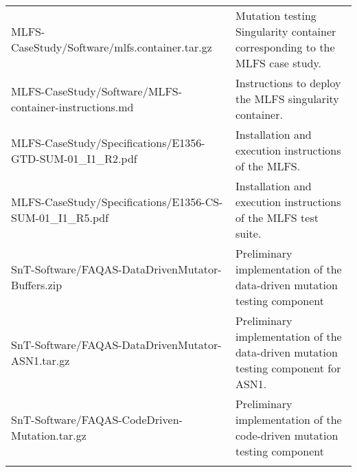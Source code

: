 \begin{longtable}{|p{8cm}|p{6cm}@{}|}
\hline
MLFS-CaseStudy/Software/mlfs.container.tar.gz&Mutation testing Singularity container corresponding to the MLFS case study.\\
MLFS-CaseStudy/Software/MLFS-container-instructions.md&Instructions to deploy the MLFS singularity container.\\
MLFS-CaseStudy/Specifications/E1356-GTD-SUM-01\_I1\_R2.pdf&Installation and execution instructions of the MLFS.\\
MLFS-CaseStudy/Specifications/E1356-CS-SUM-01\_I1\_R5.pdf&Installation and execution instructions of the MLFS test suite.\\
\hline
SnT-Software/FAQAS-DataDrivenMutator-Buffers.zip&Preliminary implementation of the data-driven mutation testing component\\
SnT-Software/FAQAS-DataDrivenMutator-ASN1.tar.gz&Preliminary implementation of the data-driven mutation testing component for ASN1.\\
SnT-Software/FAQAS-CodeDriven-Mutation.tar.gz&Preliminary implementation of the code-driven mutation testing component\\
\\
\hline


                                                    
\end{longtable}
\normalsize

\clearpage
